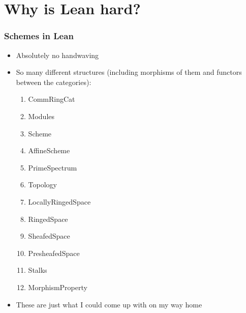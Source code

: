 \documentclass{beamer}
\begin{document}
\section{Why is Lean hard?}

\begin{frame}
    \frametitle{Schemes in Lean}

    \begin{itemize}
        \item Absolutely no handwaving

        \item So many different structures (including morphisms of them and
              functors between the categories):

              \begin{multicols}{2}
                  \begin{enumerate}
                      \item CommRingCat
                      \item Modules
                      \item Scheme
                      \item AffineScheme
                      \item PrimeSpectrum
                      \item Topology
                      \item LocallyRingedSpace
                      \item RingedSpace
                      \item SheafedSpace
                      \item PresheafedSpace
                      \item Stalks
                      \item MorphismProperty
                  \end{enumerate}
              \end{multicols}
        \item These are just what I could come up with on my way home
    \end{itemize}
\end{frame}
\end{document}
